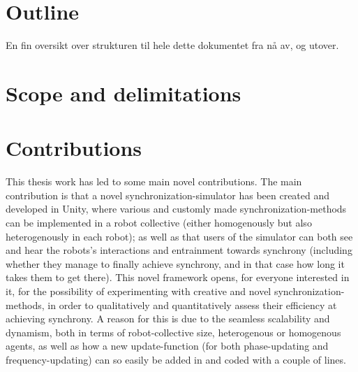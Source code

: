 


\section{Outline}
En fin  oversikt over strukturen til hele dette dokumentet fra nå av, og utover.




\section{Scope and delimitations}










\section{Contributions}






This thesis work has led to some main novel contributions. The main contribution is that a novel synchronization-simulator has been created and developed in Unity, where various and customly made synchronization-methods can be implemented in a robot collective (either homogenously but also heterogenously in each robot); as well as that users of the simulator can both see and hear the robots's interactions and entrainment towards synchrony (including whether they manage to finally achieve synchrony, and in that case how long it takes them to get there). This novel framework opens, for everyone interested in it, for the possibility of experimenting with creative and novel synchronization-methods, in order to qualitatively and quantitatively assess their efficiency at achieving synchrony. A reason for this is due to the seamless scalability and dynamism, both in terms of robot-collective size, heterogenous or homogenous agents, as well as how a new update-function (for both phase-updating and frequency-updating) can so easily be added in and coded with a couple of lines.

